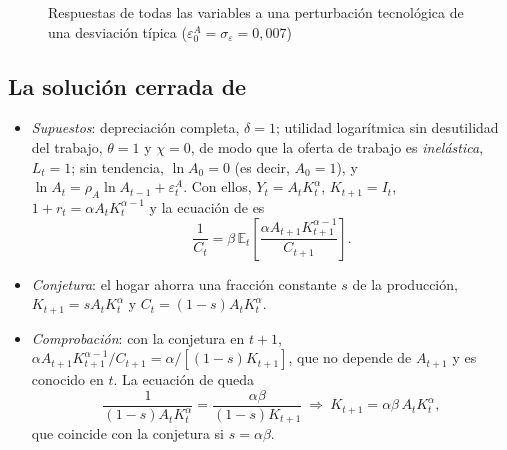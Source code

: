 \documentclass[11pt]{article}
\begin{document}
\begin{figure}[H]
\centering
\caption{Respuestas de todas las variables a una perturbación tecnológica de una desviación típica ($\varepsilon^A_0=\sigma_\varepsilon=0{,}007$)}\label{fig:irf-rbc-completo}
\end{figure}

\subsection{La solución cerrada de }

\begin{itemize}
\item \emph{Supuestos}: depreciación completa, $\delta=1$; utilidad logarítmica sin desutilidad del trabajo, $\theta=1$ y $\chi=0$, de modo que la oferta de trabajo es \emph{inelástica}, $L_t=1$; sin tendencia, $\ln A_0=0$ (es decir, $A_0=1$), y $\ln A_t=\rho_A\ln A_{t-1}+\varepsilon^A_t$. Con ellos, $Y_t=A_tK_t^{\alpha}$, $K_{t+1}=I_t$, $1+r_t=\alpha A_tK_t^{\alpha-1}$ y la ecuación de  es
  \begin{equation*}
  \frac{1}{C_t}=\beta\,\mathbb{E}_t\!\left[\frac{\alpha A_{t+1}K_{t+1}^{\alpha-1}}{C_{t+1}}\right].
  \end{equation*}
\item \emph{Conjetura}: el hogar ahorra una fracción constante $s$ de la producción, $K_{t+1}=sA_tK_t^{\alpha}$ y $C_t=(1-s)A_tK_t^{\alpha}$.
\item \emph{Comprobación}: con la conjetura en $t+1$, $\alpha A_{t+1}K_{t+1}^{\alpha-1}/C_{t+1}=\alpha/[(1-s)K_{t+1}]$, que no depende de $A_{t+1}$ y es conocido en $t$. La ecuación de  queda
  \begin{equation*}
  \frac{1}{(1-s)A_tK_t^{\alpha}}=\frac{\alpha\beta}{(1-s)K_{t+1}}\ \Longrightarrow\ K_{t+1}=\alpha\beta\,A_tK_t^{\alpha},
  \end{equation*}
  que coincide con la conjetura si $s=\alpha\beta$.
\end{itemize}
\findemo
\end{document}
